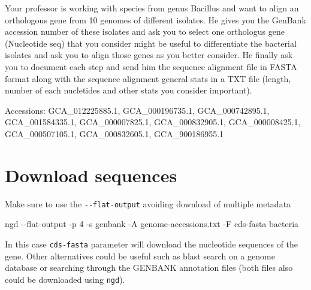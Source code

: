 \documentclass[
  letterpaper,
  DIV=11,
  numbers=noendperiod]{scrreprt}
\newenvironment{Shaded}{\begin{snugshade}}{\end{snugshade}}
\newcommand{\AttributeTok}[1]{\textcolor[rgb]{0.40,0.46,0.14}{#1}}
\newcommand{\ExtensionTok}[1]{\textcolor[rgb]{0.00,0.46,0.62}{#1}}
\newcommand{\NormalTok}[1]{\textcolor[rgb]{0.00,0.46,0.62}{#1}}
\begin{document}
\begin{tcolorbox}[standard jigsaw,toptitle=1mm, colback=white, opacitybacktitle=0.6, title=\textcolor{quarto-callout-warning-color}{\faExclamationTriangle}\hspace{0.5em}{Challenge}, toprule=.15mm, bottomtitle=1mm, colbacktitle=quarto-callout-warning-color!10!white, titlerule=0mm, arc=.35mm, colframe=quarto-callout-warning-color-frame, rightrule=.15mm, opacityback=0, bottomrule=.15mm, leftrule=.75mm, coltitle=black, left=2mm]
Your professor is working with species from genus Bacillus and want to
align an orthologous gene from 10 genomes of different isolates. He
gives you the GenBank accession number of these isolates and ask you to
select one orthologus gene (Nucleotide seq) that you consider might be
useful to differentiate the bacterial isolates and ask you to align
those genes as you better consider. He finally ask you to document each
step and send him the sequence alignment file in FASTA format along with
the sequence alignment general stats in a TXT file (length, number of
each nucletides and other stats you consider important).

Accessions: GCA\_012225885.1, GCA\_000196735.1, GCA\_000742895.1,
GCA\_001584335.1, GCA\_000007825.1, GCA\_000832905.1, GCA\_000008425.1,
GCA\_000507105.1, GCA\_000832605.1, GCA\_900186955.1
\end{tcolorbox}

\hypertarget{download-sequences}{%
\section*{Download sequences}\label{download-sequences}}

Make sure to use the \texttt{-\/-flat-output} avoiding download of
multiple metadata

\begin{Shaded}
\begin{Highlighting}[]
\ExtensionTok{ngd} \AttributeTok{{-}{-}flat{-}output} \AttributeTok{{-}p}\NormalTok{ 4 }\AttributeTok{{-}s}\NormalTok{ genbank }\AttributeTok{{-}A}\NormalTok{ genome{-}accessions.txt }\AttributeTok{{-}F}\NormalTok{ cds{-}fasta bacteria}
\end{Highlighting}
\end{Shaded}

In this case \texttt{cds-fasta} parameter will download the nucleotide
sequences of the gene. Other alternatives could be useful such as blast
search on a genome database or searching through the GENBANK annotation
files (both files also could be downloaded using \texttt{ngd}).
\end{document}
